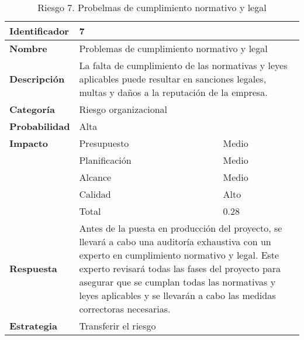 \begin{table}[H]
    \centering
    \caption{Riesgo 7. Probelmas de cumplimiento normativo y legal }
    \label{table:risk_leyes-normativas}
    \begin{tabular}{>{\columncolor{lightgreen!20}}l l l}
    \toprule
    \rowcolor{lightgreen}
    \textbf{Identificador} & \multicolumn{2}{l}{7} \\
    \midrule
    \textbf{Nombre} & \multicolumn{2}{l}{Problemas de cumplimiento normativo y legal} \\
    \midrule
    \textbf{Descripción} & \multicolumn{2}{p{10cm}}{La falta de cumplimiento de las normativas y leyes aplicables puede resultar en sanciones legales, multas y daños a la reputación de la empresa.} \\
    \midrule
    \textbf{Categoría} & \multicolumn{2}{l}{Riesgo organizacional} \\
    \midrule
    \textbf{Probabilidad} & \multicolumn{2}{l}{Alta} \\
    \midrule
    \textbf{Impacto} & Presupuesto & Medio \\
    \cmidrule(lr){2-3}
    & Planificación & Medio \\
    \cmidrule(lr){2-3}
    & Alcance & Medio \\
    \cmidrule(lr){2-3}
    & Calidad & Alto \\
    \cmidrule(lr){2-3}
    & Total & 0.28 \\
    \midrule
    \textbf{Respuesta} & \multicolumn{2}{p{10cm}}{Antes de la puesta en producción del proyecto, se llevará a cabo una auditoría exhaustiva con un experto en cumplimiento normativo y legal. Este experto revisará todas las fases del proyecto para asegurar que se cumplan todas las normativas y leyes aplicables y se llevarán a cabo las medidas correctoras necesarias.} \\
    \midrule
    \textbf{Estrategia} & \multicolumn{2}{l}{Transferir el riesgo} \\
    \bottomrule
    \end{tabular}
\end{table}


